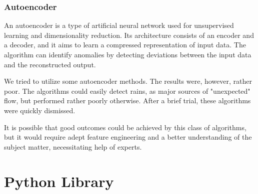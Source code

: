 \documentclass[12pt,a4paper]{article}
\begin{document}
\subsubsection{Autoencoder}
An autoencoder is a type of artificial neural network used for unsupervised learning and dimensionality reduction. Its architecture consists of an encoder and a decoder, and it aims to learn a compressed representation of input data. The algorithm can identify anomalies by detecting deviations between the input data and the reconstructed output. 

We tried to utilize some autoencoder methods. The results were, however, rather poor. The algorithms could easily detect rains, as major sources of "unexpected" flow, but performed rather poorly otherwise. After a brief trial, these algorithms were quickly dismissed.

It is possible that good outcomes could be achieved by this class of algorithms, but it would require adept feature engineering and a better understanding of the subject matter, necessitating help of experts.


\newpage
\section{Python Library} \label{sec:pyth_lib}
\end{document}
